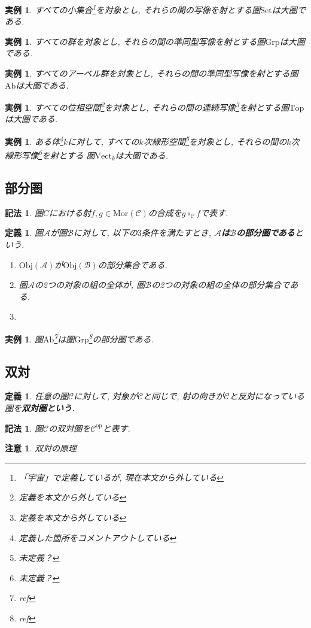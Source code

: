 \documentclass[dvipdfmx]{jsbook}
\theoremstyle{plain}
\newtheorem{Def}[thm]{定義}
\newtheorem{Notation}[thm]{記法}
\newtheorem{caution}[thm]{注意}
\newtheorem{example}[thm]{実例}
\begin{document}
\begin{example}
すべての小集合\footnote{「宇宙」で定義しているが, 現在本文から外している}を対象とし, それらの間の写像を射とする圏$\mathrm{Set}$は大圏である.
\end{example}
\begin{example}
すべての群を対象とし, それらの間の準同型写像を射とする圏$\mathrm{Grp}$は大圏である.
\end{example}
\begin{example}
すべてのアーベル群を対象とし, それらの間の準同型写像を射とする圏$\mathrm{Ab}$は大圏である.
\end{example}
\begin{example}
すべての位相空間\footnote{定義を本文から外している}を対象とし, それらの間の連続写像\footnote{定義を本文から外している}を射とする圏$\mathrm{Top}$は大圏である.
\end{example}
\begin{example}
ある体\footnote{定義した箇所をコメントアウトしている}$k$に対して,
すべての$k$次線形空間\footnote{未定義？}を対象とし,
それらの間の$k$次線形写像\footnote{未定義？}を射とする
圏$\mathrm{Vect}_k$は大圏である.
\end{example}
\subsection{部分圏}
\begin{Notation}
圏$C$における射$f,g\in\mathrm{Mor}(\mathscr{C})$の合成を$g\circ_{\mathscr{C}}f$で表す.
\end{Notation}
\begin{Def}
圏$\mathscr{A}$が圏$\mathscr{B}$に対して, 以下の$3$条件を満たすとき, {\bf $\mathscr{A}$は$\mathscr{B}$の部分圏である}という.
\begin{enumerate}
\item $\mathrm{Obj}(\mathscr{A})$が$\mathrm{Obj}(\mathscr{B})$の部分集合である.
\item 圏$\mathscr{A}$の2つの対象の組の全体が,
圏$\mathscr{B}$の2つの対象の組の全体の部分集合である.
\item
\end{enumerate}
\end{Def}
\begin{example}
圏$\mathrm{Ab}$\footnote{ref}は圏$\mathrm{Grp}$\footnote{ref}の部分圏である.
\end{example}
\subsection{双対}
\begin{Def}
任意の圏$\mathscr{C}$に対して, 対象が$\mathscr{C}$と同じで, 射の向きが$\mathcal{C}$と反対になっている圏を\bf{双対圏}という.
\end{Def}
\begin{Notation}
圏$\mathscr{C}$の双対圏を$\mathscr{C}^{\mathrm{op}}$と表す.
\end{Notation}
\begin{caution}
双対の原理
\end{caution}
\end{document}
